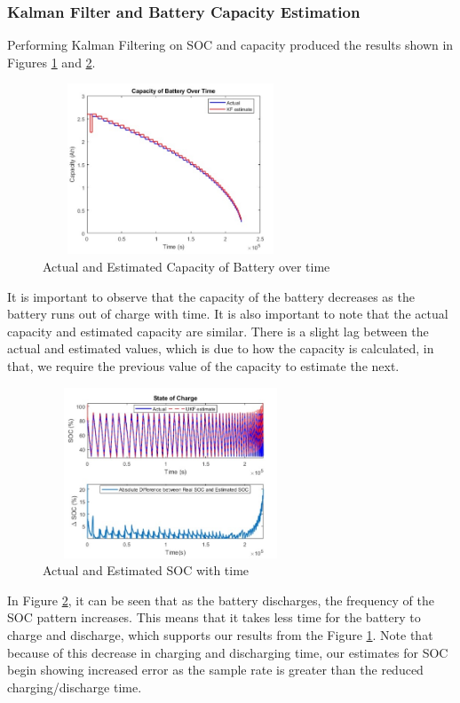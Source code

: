 \subsubsection{Kalman Filter and Battery Capacity Estimation}
Performing Kalman Filtering on SOC and capacity produced the results shown in Figures \ref{fig:capacity_1} and \ref{fig:capacity_2}.
\begin{figure}
\includegraphics[height=2in, width=3in]{figures/capacity_1}
\caption{Actual and Estimated Capacity of Battery over time}
\label{fig:capacity_1}
\end{figure}
It is important to observe that the capacity of the battery decreases as the battery runs out of charge with time. It is also important to note that the actual capacity and estimated capacity are similar. There is a slight lag between the actual and estimated values, which is due to how the capacity is calculated, in that, we require the previous value of the capacity to estimate the next.
\begin{figure}
\includegraphics[height=2in, width=3in]{figures/capacity_2}
\caption{Actual and Estimated SOC with time}
\label{fig:capacity_2}
\end{figure}
In Figure \ref{fig:capacity_2}, it can be seen that as the battery discharges, the frequency of the SOC pattern increases. This means that it takes less time for the battery to charge and discharge, which supports our results from the Figure \ref{fig:capacity_1}. Note that because of this decrease in charging and discharging time, our estimates for SOC begin showing increased error as the sample rate is greater than the reduced charging/discharge time.

